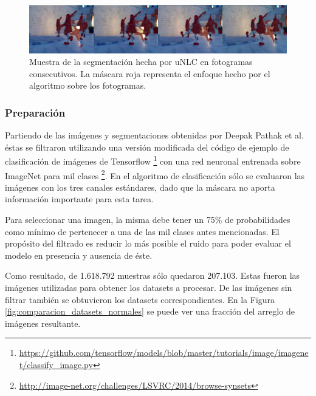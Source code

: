\documentclass[spanish]{report}
\begin{document}
\begin{figure}[H]
\centering
 \includegraphics[width=\linewidth]{overlap.jpg}
   \caption{Muestra de la segmentación hecha por uNLC en fotogramas consecutivos. La máscara roja representa el enfoque hecho por el algoritmo sobre los fotogramas.}
  \label{fig:unlc_overlap}
\end{figure}
\newpage
\subsubsection{Preparación}


Partiendo de las imágenes y segmentaciones obtenidas por Deepak Pathak et al. éstas se filtraron utilizando una versión modificada del código de ejemplo de clasificación de imágenes de Tensorflow \footnote{\url{https://github.com/tensorflow/models/blob/master/tutorials/image/imagenet/classify_image.py}} con una red neuronal entrenada sobre ImageNet para mil clases \footnote{\url{http://image-net.org/challenges/LSVRC/2014/browse-synsets}}. En el algoritmo de clasificación sólo se evaluaron las imágenes con los tres canales estándares, dado que la máscara no aporta información importante para esta tarea.
\enlargethispage{0.9in}

Para seleccionar una imagen, la misma debe tener un 75\% de probabilidades como mínimo de pertenecer a una de las mil clases antes mencionadas. El propósito del filtrado es reducir lo más posible el ruido para poder evaluar el modelo en presencia y ausencia de éste.

Como resultado, de 1.618.792 muestras sólo quedaron 207.103. Estas fueron las imágenes utilizadas para obtener los datasets a procesar. De las imágenes sin filtrar también se obtuvieron los datasets correspondientes. En la Figura \ref{fig:comparacion_datasets_normales} se puede ver una fracción del arreglo de imágenes resultante.
\end{document}
